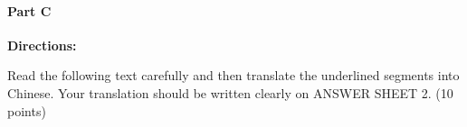 \paragraph{Part C}

\textbf{Directions:}

Read the following text carefully and then translate the underlined segments into Chinese. Your translation should be written clearly on ANSWER SHEET 2. (10 points)

\vspace{6pt}